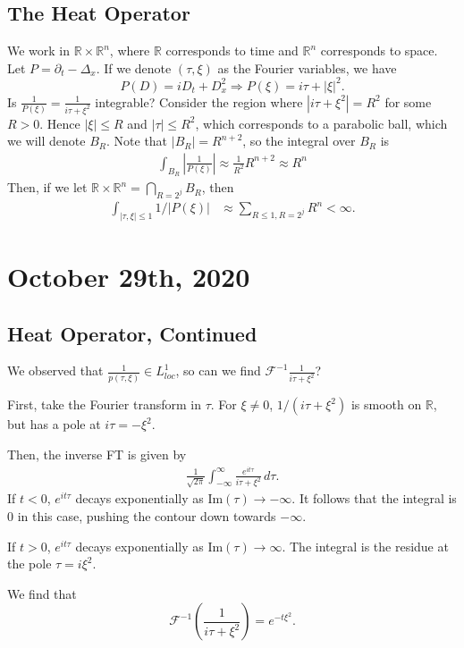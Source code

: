 \documentclass[11pt]{scrartcl}
\newcommand{\R}{\mathbb{R}}
\begin{document}
\subsection{The Heat Operator}
We work in $\R \times \R^n$, where $\R$ corresponds to time and $\R^n$ corresponds to space.  Let $P = \partial_t - \Delta_x$.  If we denote $(\tau, \xi)$ as the Fourier variables, we have 
$$P(D) = i D_t + D_x^2 \Longrightarrow P(\xi) = i\tau + |\xi|^2.$$
Is $\frac{1}{P(\xi)} = \frac{1}{i\tau + \xi^2}$ integrable?  Consider the region where $|i\tau + \xi^2| = R^2$ for some $R > 0$. Hence $|\xi| \le R$ and $|\tau| \le R^2$, which corresponds to a parabolic ball, which we will denote $B_R$.  Note that $|B_R| = R^{n+2}$, so the integral over $B_R$ is 
\begin{align*}
\int_{B_R} \left |\frac{1}{P(\xi)}\right | \approx \frac{1}{R^2} R^{n+2} \approx R^n
\end{align*} 
Then, if we let $\R \times \R^n = \bigcap_{R = 2^j} B_R$, then 
\begin{align*}
\int_{|\tau, \xi| \le 1} 1/|P(\xi)| &\approx \sum_{R \le 1, R = 2^j} R^n < \infty.
\end{align*}
\pagebreak
\section{October 29th, 2020}
\subsection{Heat Operator, Continued}
We observed that $\frac{1}{p(\tau, \xi)} \in L^1_{loc}$, so can we find $\mathcal F^{-1} \frac{1}{i\tau + \xi^2}$?

First, take the Fourier transform in $\tau$.  For $\xi \ne 0$, $1/(i\tau + \xi^2)$ is smooth on $\R$, but has a pole at $i\tau = -\xi^2$.  

Then, the inverse FT is given by
\begin{align*}
\frac{1}{\sqrt{2\pi}}\int_{-\infty}^\infty \frac{e^{it\tau}}{i\tau + \xi^2} \, d\tau.
\end{align*}
If $t < 0$, $e^{it\tau}$ decays exponentially as $\text{Im}(\tau) \to -\infty$.  It follows that the integral is $0$ in this case, pushing the contour down towards $-\infty$.

If $t > 0$, $e^{it\tau}$ decays exponentially as $\text{Im}(\tau) \to \infty$.  The integral is the residue at the pole $\tau = i\xi^2$.  

We find that 
$$\mathcal F^{-1}\left (\frac{1}{i\tau + \xi^2}\right) = e^{-t\xi^2}.$$
\end{document}
